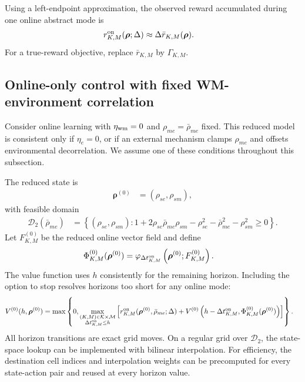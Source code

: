 \documentclass{article}
\begin{document}
Using a left-endpoint approximation, the observed reward accumulated during one online abstract mode is
\begin{align}
r_{K,M}^{\rm on}(\boldsymbol\rho;\Delta) &\approx \Delta\bar r_{K,M}(\boldsymbol\rho).
\end{align}
For a true-reward objective, replace $\bar r_{K,M}$ by $\Gamma_{K,M}$.

\subsection{Online-only control with fixed WM-environment correlation}

Consider online learning with $\eta_{\rm wm}=0$ and $\rho_{me}=\bar\rho_{me}$ fixed. This reduced model is consistent only if $\eta_e=0$, or if an external mechanism clamps $\rho_{me}$ and offsets environmental decorrelation. We assume one of these conditions throughout this subsection.

The reduced state is
\begin{align}
\boldsymbol\rho^{(0)} &= (\rho_{se},\rho_{sm}),
\end{align}
with feasible domain
\begin{align}
\mathcal D_2(\bar\rho_{me}) &= \left\{(\rho_{se},\rho_{sm}):1+2\rho_{se}\bar\rho_{me}\rho_{sm}-\rho_{se}^2-\bar\rho_{me}^2-\rho_{sm}^2\geq0\right\}.
\end{align}
Let $F_{K,M}^{(0)}$ be the reduced online vector field and define
\begin{align}
\Phi_{K,M}^{(0)}(\boldsymbol\rho^{(0)}) &= \varphi_{\Delta t_{K,M}^{\rm on}}\left(\boldsymbol\rho^{(0)};F_{K,M}^{(0)}\right).
\end{align}
The value function uses $h$ consistently for the remaining horizon. Including the option to stop resolves horizons too short for any online mode:
\begin{align}
V^{(0)}(h,\boldsymbol\rho^{(0)}) &= \max\left\{0,\max_{\substack{(K,M)\in\mathcal K\times\mathcal M \\
\Delta t_{K,M}^{\rm on}\leq h}}\left[r_{K,M}^{\rm on}(\boldsymbol\rho^{(0)},\bar\rho_{me};\Delta)+V^{(0)}\left(h-\Delta t_{K,M}^{\rm on},\Phi_{K,M}^{(0)}(\boldsymbol\rho^{(0)})\right)\right]\right\}.
\end{align}
All horizon transitions are exact grid moves. On a regular grid over $\mathcal D_2$, the state-space lookup can be implemented with bilinear interpolation. For efficiency, the destination cell indices and interpolation weights can be precomputed for every state-action pair and reused at every horizon value.
\end{document}
